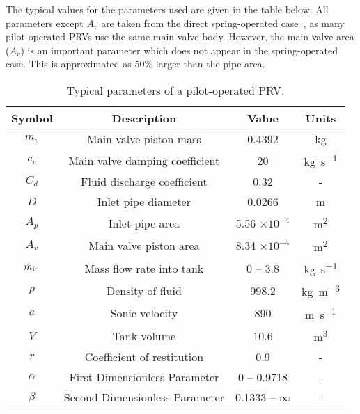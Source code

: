The typical values for the parameters used are given in the table below. All parameters except $A_v$ are taken from the direct spring-operated case~\cite{Hos2016DynamicService}, as many pilot-operated PRVs use the same main valve body. However, the main valve area ($A_v$) is an important parameter which does not appear in the spring-operated case. This is approximated as $50\%$ larger than the pipe area.
~
\begin{table}[ht]
    \centering
    \begin{tabular}{c|c|c|c}
        Symbol & Description & Value & Units \\ \hline \hline
        $m_v$ & Main valve piston mass & 0.4392 & \si{kg} \\ \hline %
        $c_v$ & Main valve damping coefficient & 20 & \si{kg.s^{-1}} \\ \hline %
        $C_d$ & Fluid discharge coefficient & 0.32 & - \\ \hline %
        $D$ & Inlet pipe diameter & 0.0266 & \si{m} \\ \hline %
        $A_p$ & Inlet pipe area & 5.56 $\times 10^{-4}$ & \si{m^2} \\ \hline
        $A_v$ & Main valve piston area & 8.34 $\times 10^{-4}$ & \si{m^2} \\ \hline
        $\dot{m}_{\rm{in}}$ & Mass flow rate into tank & 0 -- 3.8 & \si{kg.s^{-1}} \\ \hline %
        $\rho$ & Density of fluid & 998.2 & \si{kg.m^{-3}} \\ \hline %
        $a$ & Sonic velocity & 890 & \si{m.s^{-1}} \\ \hline %
        $V$ & Tank volume & 10.6 & \si{m^3} \\ \hline %
        $r$ & Coefficient of restitution & 0.9 & - \\ \hline \hline %
        $\alpha$ & First Dimensionless Parameter & 0 -- 0.9718 & - \\ \hline
        $\beta$ & Second Dimensionless Parameter & 0.1333 -- $\infty$ & - \\ %
    \end{tabular}
    \caption{Typical parameters of a pilot-operated PRV.}
    \label{tab:my_label}
\end{table}

